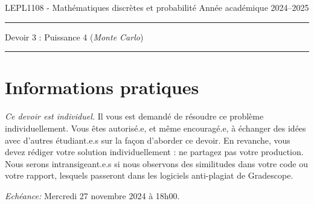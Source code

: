 \documentclass[11pt,answers]{exam}
\begin{document}
\noindent
LEPL1108 - Mathématiques discrètes et probabilité \hfill Année académique 2024--2025\\[-2mm]
\rule{\linewidth}{0.5pt}

\begin{center}

	{\large Devoir 3 : Puissance 4 (\textit{Monte Carlo})}
	\bigskip

\end{center}
\hrule
\bigskip

\section*{Informations pratiques}
\noindent

\noindent
\emph{Ce devoir est individuel.}
Il vous est demandé de résoudre ce problème individuellement. Vous êtes autorisé.e, et même encouragé.e, à échanger des idées avec d'autres étudiant.e.s sur la façon d'aborder ce devoir. En revanche, vous devez rédiger votre solution individuellement : ne partagez pas votre production. Nous serons intransigeant.e.s si nous observons des similitudes dans votre code ou votre rapport, lesquels passeront dans les logiciels anti-plagiat de Gradescope.

\bigskip \noindent
\emph{Echéance:} Mercredi 27 novembre 2024 à 18h00.

\bigskip


\noindent
\end{document}
